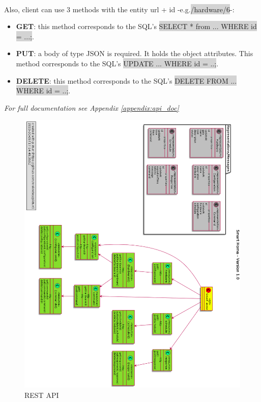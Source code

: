 \documentclass[12pt, oneside, a4paper]{book}
\newcommand{\code}[1]{{\color{red}\colorbox{lightgray}{#1}}}
\begin{document}
			 	\paragraph{}Also, client can use 3 methods with the entity url + id -e.g.\code{/hardware/6}-: 
			 	\begin{itemize}
			 		\item \textbf{GET}: this method corresponds to the SQL's \code{SELECT * from ... WHERE id = ...;}.
			 		\item \textbf{PUT}: a body of type JSON is required. It holds the object attributes. This method corresponds to the SQL's \code{UPDATE ... WHERE id = ..;}.
			 		\item \textbf{DELETE}: this method corresponds to the SQL's \code{DELETE FROM ... WHERE id = ..;}.
			 	\end{itemize} 
		 		\textit{For full documentation see Appendix \ref{appendix:api_doc}}
				\begin{figure}[H]
					\caption{REST API}
					\includegraphics[width=\linewidth]{img/rest_uml.png}
				\end{figure}	
\end{document}
